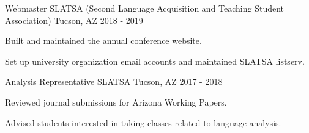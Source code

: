 \begin{cventries}
\cventry
{Webmaster} %
{SLATSA  (Second Language Acquisition and Teaching Student Association)} %
{Tucson, AZ} %
{2018 - 2019} %
{ %
\begin{cvitems}
\item {Built and maintained the annual conference website.}
\item {Set up university organization email accounts and maintained SLATSA listserv.}
\end{cvitems}
}


\cventry
{Analysis Representative} %
{SLATSA } %
{Tucson, AZ} %
{2017 - 2018} %
{ %
\begin{cvitems}
\item {Reviewed journal submissions for Arizona Working Papers.}
\item {Advised students interested in taking classes related to language analysis.}
\end{cvitems}
}


\end{cventries}
